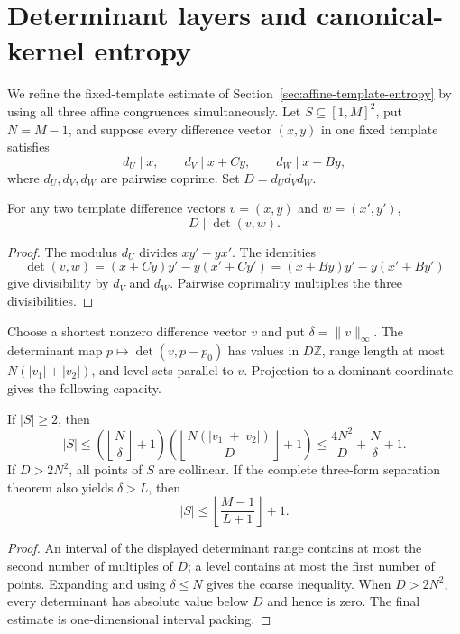 \section{Determinant layers and canonical-kernel entropy}
\label{sec:affine-determinant-layer-entropy}

We refine the fixed-template estimate of
Section~\ref{sec:affine-template-entropy} by using all three affine
congruences simultaneously.  Let $S\subseteq[1,M]^2$, put $N=M-1$, and
suppose every difference vector $(x,y)$ in one fixed template satisfies
\[
 d_U\mid x,\qquad d_V\mid x+Cy,\qquad d_W\mid x+By,
\]
where $d_U,d_V,d_W$ are pairwise coprime.  Set $D=d_Ud_Vd_W$.

\begin{proposition}
\label{prop:three-form-determinant-divisor}
For any two template difference vectors $v=(x,y)$ and $w=(x',y')$,
\[
                         D\mid\det(v,w).
\]
\end{proposition}

\begin{proof}
The modulus $d_U$ divides $xy'-yx'$.  The identities
\[
 \det(v,w)=(x+Cy)y'-y(x'+Cy')
           =(x+By)y'-y(x'+By')
\]
give divisibility by $d_V$ and $d_W$.  Pairwise coprimality multiplies the
three divisibilities.
\end{proof}

Choose a shortest nonzero difference vector $v$ and put
$\delta=\lVert v\rVert_\infty$.  The determinant map
$p\mapsto\det(v,p-p_0)$ has values in $D\mathbb Z$, range length at most
$N(|v_1|+|v_2|)$, and level sets parallel to $v$.  Projection to a dominant
coordinate gives the following capacity.

\begin{theorem}
\label{thm:determinant-layer-capacity}
If $|S|\ge2$, then
\[
 |S|\le
 \left(\left\lfloor\frac N\delta\right\rfloor+1\right)
 \left(\left\lfloor
   \frac{N(|v_1|+|v_2|)}D\right\rfloor+1\right)
 \le\frac{4N^2}{D}+\frac N\delta+1.
\]
If $D>2N^2$, all points of $S$ are collinear.  If the complete three-form
separation theorem also yields $\delta>L$, then
\[
 |S|\le\left\lfloor\frac{M-1}{L+1}\right\rfloor+1.
\]
\end{theorem}

\begin{proof}
An interval of the displayed determinant range contains at most the second
number of multiples of $D$; a level contains at most the first number of
points.  Expanding and using $\delta\le N$ gives the coarse inequality.
When $D>2N^2$, every determinant has absolute value below $D$ and hence is
zero.  The final estimate is one-dimensional interval packing.
\end{proof}

